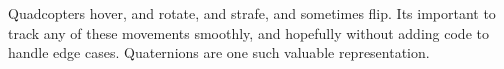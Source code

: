 \documentclass[lettersize,journal]{IEEEtran}
\begin{document}

{
Quadcopters hover, and rotate, and strafe, and sometimes flip.
Its important to track any of these movements smoothly, and hopefully without adding code to handle edge cases.
Quaternions are one such valuable representation.
}





% 





\end{document}
